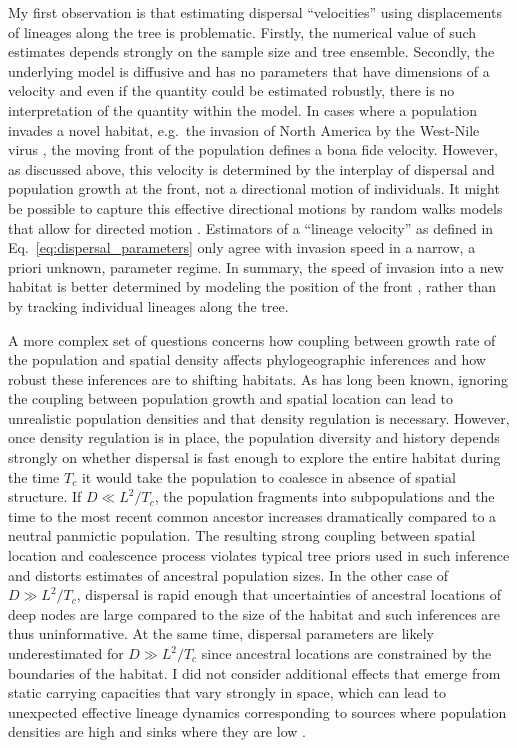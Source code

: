 \documentclass[aps,rmp, twocolumn]{revtex4}
\begin{document}
My first observation is that estimating dispersal ``velocities'' using displacements of lineages along the tree is problematic.
Firstly, the numerical value of such estimates depends strongly on the sample size and tree ensemble.
Secondly, the underlying model is diffusive and has no parameters that have dimensions of a velocity and even if the quantity could be estimated robustly, there is no interpretation of the quantity within the model.
In cases where a population invades a novel habitat, e.g.~the invasion of North America by the West-Nile virus \citep{pybus_unifying_2012}, the moving front of the population defines a bona fide velocity.
However, as discussed above, this velocity is determined by the interplay of dispersal and population growth at the front, not a directional motion of individuals.
It might be possible to capture this effective directional motions by random walks models that allow for directed motion \citep{gill_relaxed_2017}.
Estimators of a ``lineage velocity'' as defined in Eq.~\ref{eq:dispersal_parameters} only agree with invasion speed in a narrow, a priori unknown, parameter regime.
In summary, the speed of invasion into a new habitat is better determined by modeling the position of the front \citep{pybus_unifying_2012}, rather than by tracking individual lineages along the tree.


A more complex set of questions concerns how coupling between growth rate of the population and spatial density affects phylogeographic inferences and how robust these inferences are to shifting habitats.
As has long been known, ignoring the coupling between population growth and spatial location can lead to unrealistic population densities \citep{felsenstein_pain_1975} and that density regulation is necessary.
However, once density regulation is in place, the population diversity and history depends strongly on whether dispersal is fast enough to explore the entire habitat during the time $T_c$ it would take the population to coalesce in absence of spatial structure.
If $D\ll L^2/T_c$, the population fragments into subpopulations and the time to the most recent common ancestor increases dramatically compared to a neutral panmictic population.
The resulting strong coupling between spatial location and coalescence process violates typical tree priors used in such inference and distorts estimates of ancestral population sizes.
In the other case of $D\gg L^2/T_c$, dispersal is rapid enough that uncertainties of ancestral locations of deep nodes are large compared to the size of the habitat and such inferences are thus uninformative.
At the same time, dispersal parameters are likely underestimated for $D\gg L^2/T_c$ since ancestral locations are constrained by the boundaries of the habitat.
I did not consider additional effects that emerge from static carrying capacities that vary strongly in space, which can lead to unexpected effective lineage dynamics corresponding to sources where population densities are high and sinks where they are low \citep{wilkins_coalescent_2002, hallatschek_gene_2008}.
\end{document}
